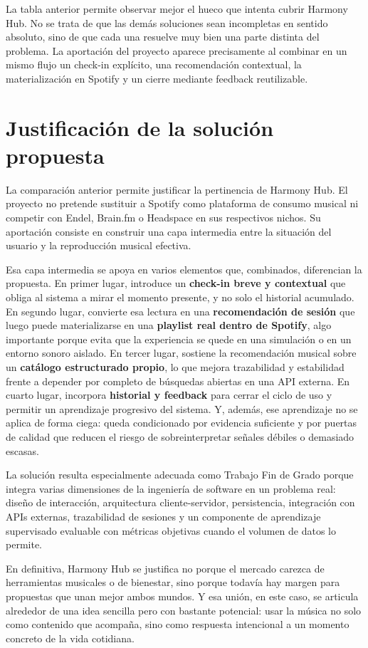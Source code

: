 La tabla anterior permite observar mejor el hueco que intenta cubrir Harmony
Hub. No se trata de que las demás soluciones sean incompletas en sentido
absoluto, sino de que cada una resuelve muy bien una parte distinta del
problema. La aportación del proyecto aparece precisamente al combinar en un
mismo flujo un check-in explícito, una recomendación contextual, la
materialización en Spotify y un cierre mediante feedback reutilizable.

\section{Justificación de la solución propuesta}
\label{sec:justificacion_solucion}

La comparación anterior permite justificar la pertinencia de Harmony Hub. El proyecto no pretende sustituir a Spotify como plataforma de consumo musical ni competir con Endel, Brain.fm o Headspace en sus respectivos nichos. Su aportación consiste en construir una capa intermedia entre la situación del usuario y la reproducción musical efectiva.

Esa capa intermedia se apoya en varios elementos que, combinados, diferencian la propuesta. En primer lugar, introduce un \textbf{check-in breve y contextual} que obliga al sistema a mirar el momento presente, y no solo el historial acumulado. En segundo lugar, convierte esa lectura en una \textbf{recomendación de sesión} que luego puede materializarse en una \textbf{playlist real dentro de Spotify}, algo importante porque evita que la experiencia se quede en una simulación o en un entorno sonoro aislado. En tercer lugar, sostiene la recomendación musical sobre un \textbf{catálogo estructurado propio}, lo que mejora trazabilidad y estabilidad frente a depender por completo de búsquedas abiertas en una API externa. En cuarto lugar, incorpora \textbf{historial y feedback} para cerrar el ciclo de uso y permitir un aprendizaje progresivo del sistema. Y, además, ese aprendizaje no se aplica de forma ciega: queda condicionado por evidencia suficiente y por puertas de calidad que reducen el riesgo de sobreinterpretar señales débiles o demasiado escasas.

La solución resulta especialmente adecuada como Trabajo Fin de Grado porque integra varias dimensiones de la ingeniería de software en un problema real: diseño de interacción, arquitectura cliente-servidor, persistencia, integración con APIs externas, trazabilidad de sesiones y un componente de aprendizaje supervisado evaluable con métricas objetivas cuando el volumen de datos lo permite.

En definitiva, Harmony Hub se justifica no porque el mercado carezca de herramientas musicales o de bienestar, sino porque todavía hay margen para propuestas que unan mejor ambos mundos. Y esa unión, en este caso, se articula alrededor de una idea sencilla pero con bastante potencial: usar la música no solo como contenido que acompaña, sino como respuesta intencional a un momento concreto de la vida cotidiana.
